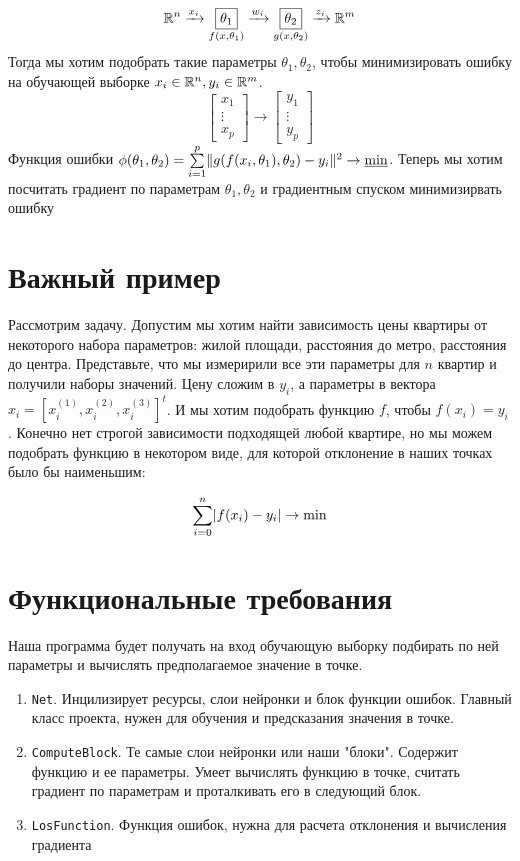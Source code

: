 \documentclass{article}
\begin{document}
$$
\R^n \xrightarrow[]{x_i} \underset{f(x, \theta_1)}{\boxed{\theta_1}} \xrightarrow[]{w_i} \underset{g(x, \theta_2)}{\boxed{\theta_2}} \xrightarrow[]{z_i} \R^m
$$
Тогда мы хотим подобрать такие параметры $\theta_1, \theta_2$, чтобы минимизировать ошибку на обучающей выборке $x_i \in \R^n, y_i \in \R^m$.
$$
\begin{bmatrix}
x_1\\
\vdots\\
x_p
\end{bmatrix}
\rightarrow
\begin{bmatrix}
y_1\\
\vdots\\
y_p
\end{bmatrix}
$$
Функция ошибки $\phi(\theta_1, \theta_2) = \Sum{i = 1}{p} \|g(f(x_i, \theta_1), \theta_2) - y_i\|^2 \rightarrow \underline{\min}$. Теперь мы хотим посчитать градиент по параметрам $\theta_1, \theta_2$ и градиентным спуском минимизирвать ошибку

\section{Важный пример}

Рассмотрим задачу. Допустим мы хотим найти зависимость цены квартиры от некоторого набора параметров: жилой площади, расстояния до метро, расстояния до центра. Представьте, что мы измеририли все эти параметры для $n$ квартир и получили наборы значений. Цену сложим в $y_i$, а параметры в вектора
$x_i =[x_i^{(1)}, x_i^{(2)}, x_i^{(3)}]^t$. И мы хотим подобрать функцию $f$, чтобы $f(x_i) = y_i$. Конечно нет строгой зависимости подходящей любой квартире, но мы можем подобрать функцию в некотором виде, для которой отклонение в наших точках было бы наименьшим:

$$
\Sum{i = 0}{n} |f(x_i) - y_i| \rightarrow \min
$$

\section{Функциональные требования}
Наша программа будет получать на вход обучающую выборку подбирать по ней параметры и вычислять предполагаемое значение в точке.
\begin{enumerate}
\item \texttt{Net}. Инцилизирует ресурсы, слои нейронки и блок функции ошибок. Главный класс проекта, нужен для обучения и предсказания значения в точке.
\item \texttt{ComputeBlock}.  Те самые слои нейронки или наши "блоки". Содержит функцию и ее параметры. Умеет вычислять функцию в точке, считать градиент по параметрам и проталкивать его в следующий блок.
\item \texttt{LosFunction}. Функция ошибок, нужна для расчета отклонения и вычисления градиента
\end{enumerate}
\end{document}
